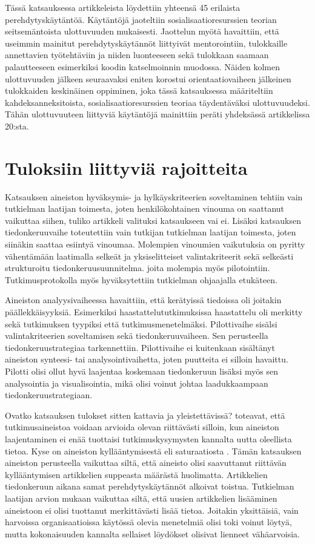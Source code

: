 \documentclass[utf8]{gradu3}
\begin{document}
Tässä katsauksessa artikkeleista löydettiin yhteensä 45 erilaista perehdytyskäytäntöä. Käytäntöjä jaoteltiin sosialisaatioresurssien teorian seitsemäntoista ulottuvuuden mukaisesti. Jaottelun myötä havaittiin, että useimmin mainitut perehdytyskäytännöt liittyivät mentorointiin, tulokkaille annettavien työtehtäviin ja niiden luonteeseen sekä tulokkaan saamaan palautteeseen esimerkiksi koodin katselmoinnin muodossa. Näiden kolmen ulottuvuuden jälkeen seuraavaksi eniten korostui orientaatiovaiheen jälkeinen tulokkaiden keskinäinen oppiminen, joka tässä katsauksessa määriteltiin kahdeksanneksitoista, sosialisaatioresurssien teoriaa täydentäväksi ulottuvuudeksi. Tähän ulottuvuuteen liittyviä käytäntöjä mainittiin peräti yhdeksässä artikkelissa 20:sta.


\section{Tuloksiin liittyviä rajoitteita}
\label{luku-rajoitteet}

Katsauksen aineiston hyväksymis- ja hylkäyskriteerien soveltaminen tehtiin vain tutkielman laatijan toimesta, joten henkilökohtainen vinouma on saattanut vaikuttaa siihen, tuliko artikkeli valituksi katsaukseen vai ei. Lisäksi katsauksen tiedonkeruuvaihe toteutettiin vain tutkijan tutkielman laatijan toimesta, joten siinäkin saattaa esiintyä vinoumaa. Molempien vinoumien vaikutuksia on pyritty vähentämään laatimalla selkeät ja yksiselitteiset valintakriteerit sekä selkeästi strukturoitu tiedonkeruusuunnitelma. joita molempia myös pilotointiin. Tutkimusprotokolla myös hyväksytettiin tutkielman ohjaajalla etukäteen.

Aineiston analyysivaiheessa havaittiin, että kerätyissä tiedoissa oli joitakin päällekkäisyyksiä. Esimerkiksi haastattelututkimuksissa haastattelu oli merkitty sekä tutkimuksen tyypiksi että tutkimusmenetelmäksi. Pilottivaihe sisälsi valintakriteerien soveltamisen sekä tiedonkeruuvaiheen. Sen perusteella tiedonkeruustrategiaa tarkennettiin. Pilottivaihe ei kuitenkaan sisältänyt aineiston synteesi- tai analysointivaihetta, joten puutteita ei silloin havaittu. Pilotti olisi ollut hyvä laajentaa koskemaan tiedonkeruun lisäksi myös sen analysointia ja visualisointia, mikä olisi voinut johtaa laadukkaampaan tiedonkeruustrategiaan.

Ovatko katsauksen tulokset sitten kattavia ja yleistettävissä? \textcite{eskola-suoranta-1998} toteavat, että tutkimusaineistoa voidaan arvioida olevan riittävästi silloin, kun aineiston laajentaminen ei enää tuottaisi tutkimuskysymysten kannalta uutta oleellista tietoa. Kyse on aineiston kyllääntymisestä eli saturaatiosta \parencite{eskola-suoranta-1998}. Tämän katsauksen aineiston perusteella vaikuttaa siltä, että aineisto olisi saavuttanut riittävän kyllääntymisen artikkelien suppeasta määrästä huolimatta. Artikkelien tiedonkeruun aikana samat perehdytyskäytännöt alkoivat toistua. Tutkielman laatijan arvion mukaan vaikuttaa siltä, että uusien artikkelien lisääminen aineistoon ei olisi tuottanut merkittävästi lisää tietoa. Joitakin yksittäisiä, vain harvoissa organisaatioissa käytössä olevia menetelmiä olisi toki voinut löytyä, mutta kokonaisuuden kannalta sellaiset löydökset olisivat lienneet vähäarvoisia.
\end{document}
